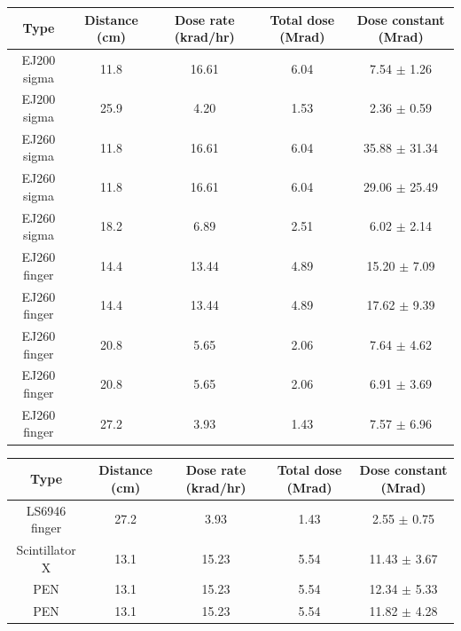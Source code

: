 \begin{table}[htbh]
\begin{center}
\begin{tabular}{|c|c|c|c|c|}
\hline
Type & Distance (cm) & Dose rate (krad/hr) & Total dose (Mrad) & Dose constant (Mrad)\\
\hline
\hline
EJ200 sigma & 11.8 & 16.61 & 6.04 & 7.54 $\pm$ 1.26\\
EJ200 sigma & 25.9 & 4.20 & 1.53 & 2.36 $\pm$ 0.59\\
EJ260 sigma & 11.8 & 16.61 & 6.04 & 35.88 $\pm$ 31.34\\
EJ260 sigma & 11.8 & 16.61 & 6.04 & 29.06 $\pm$ 25.49\\
EJ260 sigma & 18.2 & 6.89 & 2.51 & 6.02 $\pm$ 2.14\\
EJ260 finger & 14.4 & 13.44 & 4.89 & 15.20 $\pm$ 7.09\\
EJ260 finger & 14.4 & 13.44 & 4.89 & 17.62 $\pm$ 9.39\\
EJ260 finger & 20.8 & 5.65 & 2.06 & 7.64 $\pm$ 4.62\\
EJ260 finger & 20.8 & 5.65 & 2.06 & 6.91 $\pm$ 3.69\\
EJ260 finger & 27.2 & 3.93 & 1.43 & 7.57 $\pm$ 6.96\\
\hline
\end{tabular}
\end{center}
\end{table}

\begin{table}[htbh]
\begin{center}
\begin{tabular}{|c|c|c|c|c|}
\hline
Type & Distance (cm) & Dose rate (krad/hr) & Total dose (Mrad) & Dose constant (Mrad)\\
\hline
\hline
LS6946 finger & 27.2 & 3.93 & 1.43 & 2.55 $\pm$ 0.75\\
Scintillator X & 13.1 & 15.23 & 5.54 & 11.43 $\pm$ 3.67\\
PEN & 13.1 & 15.23 & 5.54 & 12.34 $\pm$ 5.33\\
PEN & 13.1 & 15.23 & 5.54 & 11.82 $\pm$ 4.28\\
\hline
\end{tabular}
\end{center}
\end{table}


